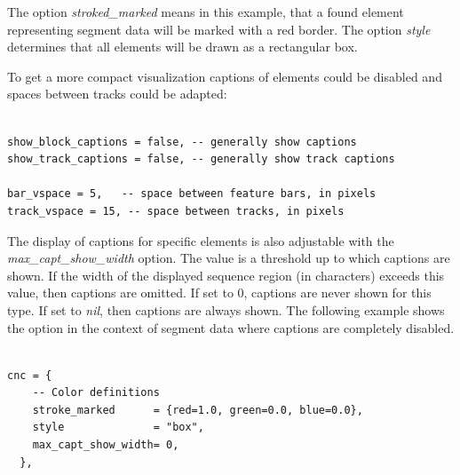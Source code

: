 \documentclass[11pt,final]{article}
\begin{document}
The option \textit{stroked\_marked} means in this example, that a found element
representing segment data will be marked with a red border. The option
\textit{style} determines that all elements will be drawn as a rectangular
box.

To get a more compact visualization captions of elements could be disabled
and spaces between tracks could be adapted:

\begin{verbatim}

show_block_captions = false, -- generally show captions
show_track_captions = false, -- generally show track captions

bar_vspace = 5,   -- space between feature bars, in pixels
track_vspace = 15, -- space between tracks, in pixels

\end{verbatim}

The display of captions for specific elements is also adjustable with the
\textit{max\_capt\_show\_width} option. The value is a threshold up to which
captions are shown. If the width of the displayed sequence region
(in characters) exceeds this value, then captions are omitted. If set to 0,
captions are never shown for this type. If set to \textit{nil}, then captions are
always shown.
The following example shows the option in the context of segment data where
captions are completely disabled.

\begin{verbatim}

cnc = {
    -- Color definitions
    stroke_marked      = {red=1.0, green=0.0, blue=0.0},
    style              = "box",
    max_capt_show_width= 0,
  },


\end{verbatim}

\end{document}
